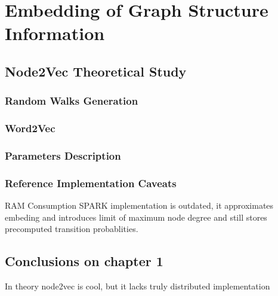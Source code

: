 \chapter{Embedding of Graph Structure Information}\label{chap:1}

\section{Node2Vec Theoretical Study}

\subsection{Random Walks Generation}
\subsection{Word2Vec}

\subsection{Parameters Description}

\subsection{Reference Implementation Caveats}
RAM Consumption
SPARK implementation is outdated, it approximates embeding and introduces limit of maximum node degree and still stores precomputed transition probablities. 





\section{Conclusions on chapter 1}
In theory node2vec is cool, but it lacks truly distributed implementation

